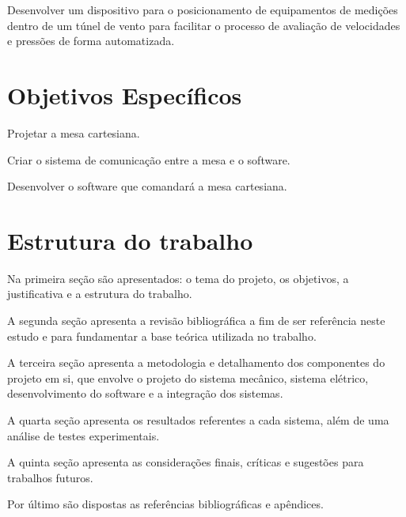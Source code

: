 Desenvolver um dispositivo para o posicionamento de equipamentos de medições dentro de um túnel de vento para 
facilitar o processo de avaliação de velocidades e pressões de forma automatizada.

\section{Objetivos Específicos}\label{sec:objetivoesp}

	\begin{alineas}
		\item Projetar a mesa cartesiana.
		\item Criar o sistema de comunicação entre a mesa e o software.
		\item Desenvolver o software que comandará a mesa cartesiana.
	\end{alineas}

\section{Estrutura do trabalho}\label{sec:estruturatrab}

Na primeira seção são apresentados: o tema do projeto, os objetivos, 
a justificativa e a estrutura do trabalho.

A segunda seção apresenta a revisão bibliográfica a fim de ser referência neste estudo e para fundamentar 
a base teórica utilizada no trabalho.

A terceira seção apresenta a metodologia e detalhamento dos componentes do projeto em si, 
que envolve o projeto do sistema mecânico, sistema elétrico, desenvolvimento do software 
e a integração dos sistemas.

A quarta seção apresenta os resultados referentes a cada sistema, além de uma análise de testes experimentais.

A quinta seção apresenta as considerações finais, críticas e sugestões para trabalhos futuros.

Por último são dispostas as referências bibliográficas e apêndices.